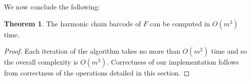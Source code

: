 \documentclass[10pt,a4paper]{amsart}
\newcommand {\mm}[1] {\ifmmode{#1}\else{\mbox{\(#1\)}}\fi}
\newcommand{\Bcal}        {\mm{\mathcal{B}}}
\newcommand{\hcb}{{harmonic chain barcode}}
\theoremstyle{definition}
\newcommand{\filt}{F}
\newcommand{\filtcnt}{m}
\newcommand{\fsimp}{\sigma}
\newcommand{\Chn}{C}
\newcommand{\Bnd}{B}
\newcommand{\Real}{\mathbb{R}}
\newcommand{\Cobmat}{\mathtt{Cob}}
\newcommand{\Chnmat}{\mathtt{SC}}
\newcommand{\Bndmat}{\mathtt{BoC}}
\newcommand{\aG}{\alpha}
\newcommand{\sG}{\sigma}
\newcommand{\dG}{\delta}
\newcommand{\lG}{\lambda}
\newcommand{\zG}{\zeta}
\newtheorem{theorem}{Theorem}
\newtheorem{proposition}[theorem]{Proposition}
\theoremstyle{remark}
\begin{document}
\bigskip

We now  conclude the following:
\begin{theorem}
    The \hcb{} of $\filt$ can be computed in $O(\filtcnt^3)$ time.
\end{theorem}
\begin{proof}
Each iteration of the algorithm takes no more than $O(\filtcnt^2)$ time
and so
the overall complexity 
is $O(\filtcnt^3)$.
Correctness of our implementation 
follows from 
correctness of the operations detailed in this section.
\end{proof}





\end{document}

